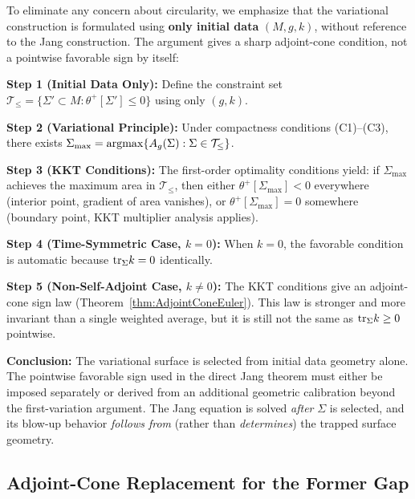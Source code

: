 \begin{remark}\label{rem:SelfContainedFavorable}
To eliminate any concern about circularity, we emphasize that the variational construction is formulated using \textbf{only initial data} $(M, g, k)$, without reference to the Jang construction. The argument gives a sharp adjoint-cone condition, not a pointwise favorable sign by itself:

\textbf{Step 1 (Initial Data Only):} Define the constraint set $\mathcal{T}_{\le} = \{\Sigma' \subset M : \theta^+[\Sigma'] \le 0\}$ using only $(g, k)$.

\textbf{Step 2 (Variational Principle):} Under compactness conditions (C1)--(C3), there exists $\Sigma_{\max} = \operatorname*{argmax}\{A_g(\Sigma) : \Sigma \in \mathcal{T}_{\le}\}$.

\textbf{Step 3 (KKT Conditions):} The first-order optimality conditions yield: if $\Sigma_{\max}$ achieves the maximum area in $\mathcal{T}_{\le}$, then either $\theta^+[\Sigma_{\max}] < 0$ everywhere (interior point, gradient of area vanishes), or $\theta^+[\Sigma_{\max}] = 0$ somewhere (boundary point, KKT multiplier analysis applies).

\textbf{Step 4 (Time-Symmetric Case, $k = 0$):} When $k = 0$, the favorable condition is automatic because $\mathrm{tr}_\Sigma k=0$ identically.

\textbf{Step 5 (Non-Self-Adjoint Case, $k \neq 0$):} The KKT conditions give an adjoint-cone sign law (Theorem~\ref{thm:AdjointConeEuler}). This law is stronger and more invariant than a single weighted average, but it is still not the same as $\mathrm{tr}_\Sigma k\ge0$ pointwise.



\textbf{Conclusion:} The variational surface is selected from initial data geometry alone. The pointwise favorable sign used in the direct Jang theorem must either be imposed separately or derived from an additional geometric calibration beyond the first-variation argument. The Jang equation is solved \emph{after} $\Sigma$ is selected, and its blow-up behavior \emph{follows from} (rather than \emph{determines}) the trapped surface geometry.
\end{remark}

\subsection{Adjoint-Cone Replacement for the Former Gap}
\label{subsec:GapClosureMath}

